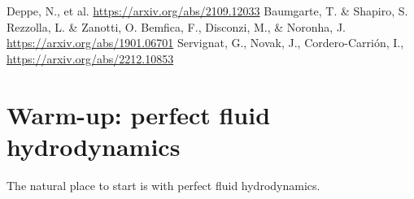 \documentclass[12pt]{article}
\numberwithin{equation}{section}
\begin{document}




\clearpage

\begin{thebibliography}{10}
 Deppe, N., et al. \url{https://arxiv.org/abs/2109.12033}
 Baumgarte, T. \& Shapiro, S.
 Rezzolla, L. \& Zanotti, O.
 Bemfica, F., Disconzi, M., \& Noronha, J. \url{https://arxiv.org/abs/1901.06701}
 Servignat, G., Novak, J., Cordero-Carri\'on, I., \url{https://arxiv.org/abs/2212.10853}
\end{thebibliography}

\appendix

\clearpage

\section{Warm-up: perfect fluid hydrodynamics}

The natural place to start is with perfect fluid hydrodynamics.
\end{document}
